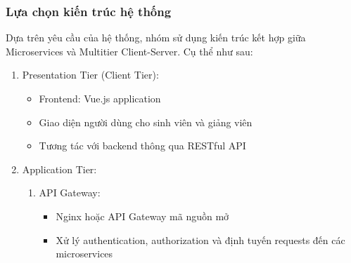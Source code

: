 \subsubsection{Lựa chọn kiến trúc hệ thống}
Dựa trên yêu cầu của hệ thống, nhóm sử dụng kiến trúc kết hợp giữa Microservices và Multitier Client-Server. Cụ thể như sau:
\begin{enumerate}
    \item Presentation Tier (Client Tier):
    \begin{itemize}
        \item Frontend: Vue.js application
        \item Giao diện người dùng cho sinh viên và giảng viên
        \item Tương tác với backend thông qua RESTful API
    \end{itemize}
    \item Application Tier:
    \begin{enumerate}
        \item API Gateway:
        \begin{itemize}
            \item Nginx hoặc API Gateway mã nguồn mở
            \item Xử lý authentication, authorization và định tuyến requests đến các microservices
        \end{itemize}


\end{enumerate}
\end{enumerate}
